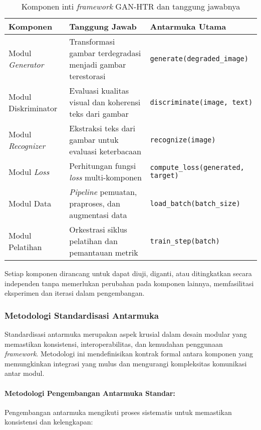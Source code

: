 \documentclass[12pt,a4paper]{article}
\begin{document}
\begin{table}[H]
\centering
\caption{Komponen inti \textit{framework} GAN-HTR dan tanggung jawabnya}
\label{tab:komponen-inti}
\small
\begin{tabular}{|l|p{5.5cm}|p{5.5cm}|}
\hline
\textbf{Komponen} & \textbf{Tanggung Jawab} & \textbf{Antarmuka Utama} \\ \hline
Modul \textit{Generator} & Transformasi gambar terdegradasi menjadi gambar terestorasi & \texttt{generate(degraded\_image)} \\ \hline
Modul Diskriminator & Evaluasi kualitas visual dan koherensi teks dari gambar & \texttt{discriminate(image, text)} \\ \hline
Modul \textit{Recognizer} & Ekstraksi teks dari gambar untuk evaluasi keterbacaan & \texttt{recognize(image)} \\ \hline
Modul \textit{Loss} & Perhitungan fungsi \textit{loss} multi-komponen & \texttt{compute\_loss(generated, target)} \\ \hline
Modul Data & \textit{Pipeline} pemuatan, praproses, dan augmentasi data & \texttt{load\_batch(batch\_size)} \\ \hline
Modul Pelatihan & Orkestrasi siklus pelatihan dan pemantauan metrik & \texttt{train\_step(batch)} \\ \hline
\end{tabular}
\end{table}

Setiap komponen dirancang untuk dapat diuji, diganti, atau ditingkatkan secara independen tanpa memerlukan perubahan pada komponen lainnya, memfasilitasi eksperimen dan iterasi dalam pengembangan.

\subsubsection{Metodologi Standardisasi Antarmuka}
Standardisasi antarmuka merupakan aspek krusial dalam desain modular yang memastikan konsistensi, interoperabilitas, dan kemudahan penggunaan \textit{framework}. Metodologi ini mendefinisikan kontrak formal antara komponen yang memungkinkan integrasi yang mulus dan mengurangi kompleksitas komunikasi antar modul.

\paragraph{Metodologi Pengembangan Antarmuka Standar:}
Pengembangan antarmuka mengikuti proses sistematis untuk memastikan konsistensi dan kelengkapan:
\end{document}
